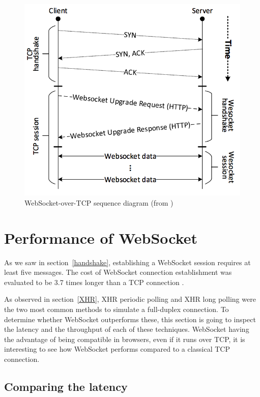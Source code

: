 \documentclass[10pt,journal,compsoc]{IEEEtran}
\newcommand{\ws}{WebSocket}
\begin{document}
\begin{figure}
    \centering
    \includegraphics[width=\linewidth]{websocket_tcp_diagram.png}
    \caption{\ws-over-TCP sequence diagram (from \cite{performanceEvaluationOfWebsocketProtocol})}
    \label{fig:websocket_connection}
\end{figure}


\section{Performance of \ws{}}

As we saw in section~\ref{handshake}, establishing a \ws{} session requires at least five messages.
The cost of \ws{} connection establishment was evaluated to be 3.7 times longer than a TCP connection \cite{performanceEvaluationOfWebsocketProtocol}.  %

As observed in section~\ref{XHR}, XHR periodic polling and XHR long polling were the two most common methods to simulate a full-duplex connection.
To determine whether \ws{} outperforms these, this section is going to inspect the latency and the throughput of each of these techniques.
\ws{} having the advantage of being compatible in browsers, even if it runs over TCP, 
it is interesting to see how \ws{} performs compared to a classical TCP connection.

\subsection{Comparing the latency}
\end{document}
